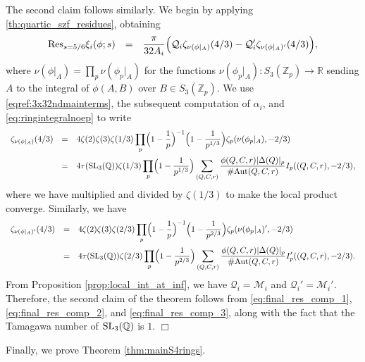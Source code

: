 \documentclass{article}
\def\Z{{\mathbb Z}}
\def\SL{{\rm SL}}
\def\Aut{{\rm Aut}}
\def\Res{{\rm Res}}
\def\R{{\mathbb R}}
\def\Q{{\mathbb Q}}
\def\Z{{\mathbb Z}}
\def\Q{{\mathbb Q}}
\newenvironment{proof}{\noindent {\bf Proof:}}{$\Box$ \vspace{2 ex}}
\begin{document}
\begin{proof}
The second claim follows similarly. We begin by applying \ref{th:quartic_szf_residues}, obtaining
\begin{equation}\label{eq:final_res_comp_1}
\begin{array}{rcl}
\Res_{s=5/6}\xi_{i}(\phi;s)
&=&\displaystyle
\frac{\pi}{32A_i}
\Bigl(
\mathcal Q_i \zeta_{\nu(\phi|_A)}(4/3)
-
\mathcal Q_i' \zeta_{\nu(\phi|_A)'}(4/3)
\Bigr),
\end{array}
\end{equation}
where $\nu(\phi|_A)=\prod_p\nu(\phi_p|_A)$ for the functions $\nu(\phi_p|_A):S_3(\Z_p)\to\R$ sending $A$ to the integral of $\phi(A,B)$ over $B\in S_3(\Z_p)$. We use \eqref{eqref:3x32ndmainterms}, the subsequent computation of $\alpha_i$, and \eqref{eq:ringintegralnoep} to write
\begin{equation}\label{eq:final_res_comp_2}
\begin{array}{rcl}
\zeta_{\nu(\phi|_A)}(4/3)&=&\displaystyle 4\zeta(2)\zeta(3)\zeta(1/3)\prod_p\Bigl(1-\frac1{p}\Bigr)^{-1}\Bigl(1-\frac1{p^{1/3}}\Bigr)\zeta_p(\nu(\phi_p|_A),-2/3)
\\[.2in]&=&\displaystyle
4\tau(\SL_3(\Q))\zeta(1/3)\prod_p\Bigl(1-\frac1{p^{1/3}}\Bigr)\sum_{(Q,C,r)}\frac{\phi(Q,C,r)|\Delta(Q)|_p}{\#\Aut(Q,C,r)}I_p((Q,C,r),-2/3),
\end{array}
\end{equation}
where we have multiplied and divided by $\zeta(1/3)$ to make the local product converge. Similarly, we have
\begin{equation}\label{eq:final_res_comp_3}
\begin{array}{rcl}
\zeta_{\nu(\phi|_A)'}(4/3)&=&\displaystyle 4\zeta(2)\zeta(3)\zeta(2/3)\prod_p\Bigl(1-\frac1{p}\Bigr)^{-1}\Bigl(1-\frac1{p^{2/3}}\Bigr)\zeta_p(\nu(\phi_p|_A)',-2/3)
\\[.2in]&=&\displaystyle
4\tau(\SL_3(\Q))\zeta(2/3)\prod_p\Bigl(1-\frac1{p^{2/3}}\Bigr)\sum_{(Q,C,r)}\frac{\phi(Q,C,r)|\Delta(Q)|_p}{\#\Aut(Q,C,r)}I_p'((Q,C,r),-2/3).
\end{array}
\end{equation}
From Proposition \ref{prop:local_int_at_inf}, we have $\mathcal Q_i=\mathcal M_i$ and $\mathcal Q_i'=\mathcal M_i'$. Therefore, the second claim of the theorem follows from \eqref{eq:final_res_comp_1}, \eqref{eq:final_res_comp_2}, and \eqref{eq:final_res_comp_3}, along with the fact that the Tamagawa number of $\SL_3(\Q)$ is $1$.
\end{proof}


Finally, we prove Theorem \ref{thm:mainS4rings}.
\end{document}
